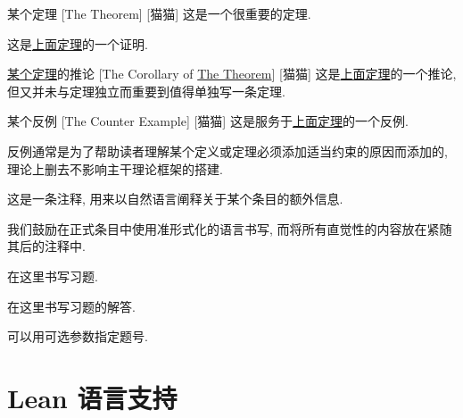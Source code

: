 \documentclass[UTF8]{ctexart}
\begin{document}
        \begin{thm}
            [TheTheorem]
            {某个定理}
            [The Theorem]
            [猫猫]
            这是一个很重要的定理. 
        \end{thm}
            
        \begin{prf}
            这是\hyperref[thm:TheTheorem]{上面定理}的一个证明. 
        \end{prf}
        
        \begin{crl}
            [TheCorollary]
            {\hyperref[thm:TheTheorem]{某个定理}的推论}
            [The Corollary of \hyperref[thm:TheTheorem]{The Theorem}]
            [猫猫]
            这是\hyperref[thm:TheTheorem]{上面定理}的一个推论, 但又并未与定理独立而重要到值得单独写一条定理. 
        \end{crl}
        
        \begin{cxmp}
            [TheCounterExample]
            {某个反例}
            [The Counter Example]
            [猫猫]
            这是服务于\hyperref[thm:TheTheorem]{上面定理}的一个反例. 
            
            反例通常是为了帮助读者理解某个定义或定理必须添加适当约束的原因而添加的, 理论上删去不影响主干理论框架的搭建. 
        \end{cxmp}
        
        \begin{rmk}
            这是一条注释, 用来以自然语言阐释关于某个条目的额外信息. 

            我们鼓励在正式条目中使用准形式化的语言书写, 而将所有直觉性的内容放在紧随其后的注释中. 
        \end{rmk}
        
        \begin{pbm}
            在这里书写习题. 
        \end{pbm}
        
        \begin{slt}
            在这里书写习题的解答. 
        \end{slt}
        
        \begin{pbm}[3]
            可以用可选参数指定题号. 
        \end{pbm}
        

    \section{Lean 语言支持}
\end{document}
